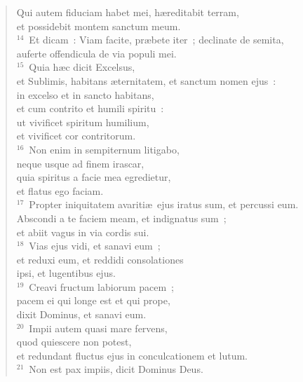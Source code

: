  \begin{verse}Qui autem fiduciam habet mei, h\ae reditabit terram,\\ et possidebit montem sanctum meum.\\
${}^{14}$~Et dicam~: Viam facite, pr\ae bete iter~; declinate de semita,\\ auferte offendicula de via populi mei.\\
${}^{15}$~Quia h\ae c dicit Excelsus,\\ et Sublimis, habitans \ae ternitatem, et sanctum nomen ejus~:\\ in excelso et in sancto habitans,\\ et cum contrito et humili spiritu~:\\ ut vivificet spiritum humilium,\\ et vivificet cor contritorum.\\
${}^{16}$~Non enim in sempiternum litigabo,\\ neque usque ad finem irascar,\\ quia spiritus a facie mea egredietur,\\ et flatus ego faciam.\\
${}^{17}$~Propter iniquitatem avariti\ae\ ejus iratus sum, et percussi eum.\\ Abscondi a te faciem meam, et indignatus sum~;\\ et abiit vagus in via cordis sui.\\
${}^{18}$~Vias ejus vidi, et sanavi eum~;\\ et reduxi eum, et reddidi consolationes\\ ipsi, et lugentibus ejus.\\
${}^{19}$~Creavi fructum labiorum pacem~;\\ pacem ei qui longe est et qui prope,\\ dixit Dominus, et sanavi eum.\\
${}^{20}$~Impii autem quasi mare fervens,\\ quod quiescere non potest,\\ et redundant fluctus ejus in conculcationem et lutum.\\
${}^{21}$~Non est pax impiis, dicit Dominus Deus.\end{verse}


